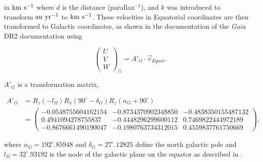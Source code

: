 \documentclass{aastex62}
\begin{document}
	\noindent
	in $\rm km~s^{-1}$ where $d$ is the distance (parallax$^{-1}$), and $k$ was introduced to transform $\rm au~yr^{-1}$ to $\rm km~s^{-1}$. These velocities in Equatorial coordinates are then transformed to Galactic coordinates, as shown in the documentation of the \textit{Gaia} DR2 documentation \citep{documentation} using 
	
	\begin{equation}
	\quad \left(\begin{array}{c} U \\ V \\ W \end{array}\right)_\odot = \mathbf{\textit{A}}{'}_{G} \cdot \vec{v}_{Equat}.
	\end{equation}
	
	\noindent
	$\mathbf{\textit{A}}{'}_{G}$ is a transformation matrix,
	
	\begin{equation}
	\begin{split}
	\mathbf{\textit{A}}{'}_{G}&=\mathbf{\textit{R}}_{z}(-l_{\Omega})\mathbf{\textit{R}}_{x}(90^\circ-\delta_G)\mathbf{\textit{R}}_z(\alpha_G+90^\circ)\\
	&=
	\left(
	\begin{array}{cccc}
	-0.0548755604162154& -0.8734370902348850& -0.4838350155487132\\
	0.4941094278755837& -0.4448296299600112& 0.7469822444972189\\
	-0.8676661490190047& -0.1980763734312015& 0.4559837761750669
	\end{array}
	\right), 
	\end{split}
	\end{equation}
	
	\noindent
	where $\alpha_G=192^\circ.85948$ and $\delta_G=27^\circ.12825$ define the north galactic pole and $l_\Omega=32^\circ.93192$ is the node of the galactic plane on the equator as described in \citep{coords}.
	
\end{document}
